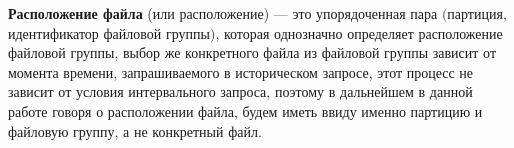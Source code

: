 \begin{definition}\label{def:location}
    \textbf{Расположение файла} (или расположение) --- это упорядоченная пара $($партиция, идентификатор файловой группы$)$, которая однозначно определяет расположение файловой группы, выбор же конкретного файла из файловой группы зависит от момента времени, запрашиваемого в историческом запросе, этот процесс не зависит от условия интервального запроса, поэтому в дальнейшем в данной работе говоря о расположении файла, будем иметь ввиду именно партицию и файловую группу, а не конкретный файл. 
\end{definition}
